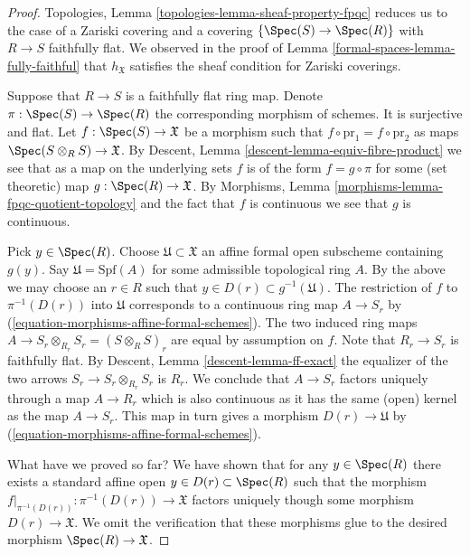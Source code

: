 \begin{proof}
Topologies, Lemma \ref{topologies-lemma-sheaf-property-fpqc}
reduces us to the case of a Zariski covering and a covering
$\{\Spec(S) \to \Spec(R)\}$ with $R \to S$ faithfully flat.
We observed in the proof of Lemma \ref{formal-spaces-lemma-fully-faithful}
that $h_\mathfrak X$ satisfies the sheaf condition for Zariski coverings.

\medskip\noindent
Suppose that $R \to S$ is a faithfully flat ring map.
Denote $\pi : \Spec(S) \to \Spec(R)$ the
corresponding morphism of schemes. It is surjective and flat.
Let $f : \Spec(S) \to \mathfrak X$ be a morphism
such that $f \circ \text{pr}_1 = f \circ \text{pr}_2$
as maps $\Spec(S \otimes_R S) \to \mathfrak X$.
By Descent, Lemma \ref{descent-lemma-equiv-fibre-product}
we see that as a map on the underlying
sets $f$ is of the form $f = g \circ \pi$ for some
(set theoretic) map $g : \Spec(R) \to \mathfrak X$.
By Morphisms, Lemma \ref{morphisms-lemma-fpqc-quotient-topology}
and the fact that $f$ is continuous we see that $g$
is continuous.

\medskip\noindent
Pick $y \in \Spec(R)$. Choose $\mathfrak U \subset \mathfrak X$
an affine formal open subscheme containing $g(y)$.
Say $\mathfrak U = \text{Spf}(A)$ for some admissible topological
ring $A$. By the above we may choose an $r \in R$ such that
$y \in D(r) \subset g^{-1}(\mathfrak U)$.
The restriction of $f$ to $\pi^{-1}(D(r))$ into $\mathfrak U$
corresponds to a continuous ring map $A \to S_r$ by
(\ref{equation-morphisms-affine-formal-schemes}). The two induced ring maps
$A \to S_r \otimes_{R_r} S_r = (S \otimes_R S)_r$ are equal
by assumption on $f$.
Note that $R_r \to S_r$ is faithfully flat.
By Descent, Lemma \ref{descent-lemma-ff-exact} the equalizer of
the two arrows $S_r \to S_r \otimes_{R_r} S_r$ is $R_r$.
We conclude that $A \to S_r$ factors uniquely through a map $A \to R_r$
which is also continuous as it has the same (open) kernel as the
map $A \to S_r$. This map in turn gives a morphism $D(r) \to \mathfrak U$ by
(\ref{equation-morphisms-affine-formal-schemes}).

\medskip\noindent
What have we proved so far? We have shown that for any $y \in \Spec(R)$
there exists a standard affine open
$y \in D(r) \subset \Spec(R)$ such that the morphism
$f|_{\pi^{-1}(D(r))} : \pi^{-1}(D(r)) \to \mathfrak X$ factors uniquely
though some morphism $D(r) \to \mathfrak X$. We omit the
verification that these morphisms glue to the desired
morphism $\Spec(R) \to \mathfrak X$.
\end{proof}


